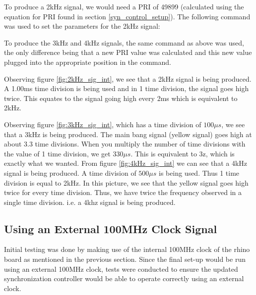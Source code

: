 \documentclass[12pt, a4paper]{article}
\begin{document}
To produce a 2kHz signal, we would need a PRI of 49899 (calculated using the equation for PRI found in section \ref{syn_control_setup}). The following command was used to set the parameters for the 2kHz signal:
	
		
To produce the 3kHz and 4kHz signals, the same command as above was used, the only difference being that a new PRI value was calculated and this new value plugged into the appropriate position in the command.

Observing figure \ref{fig:2kHz_sig_int}, we see that a 2kHz signal is being produced. A 1.00ms time division is being used and in 1 time division, the signal goes high twice. This equates to the signal going high every 2ms which is equivalent to 2kHz. 


Observing figure \ref{fig:3kHz_sig_int}, which has a time division of \( 100\mu s\), we see that a 3kHz is being produced. The main bang signal (yellow signal) goes high at about 3.3 time divisions. When you multiply the number of time divisions with the value of 1 time division, we get \(330\mu s\). This is equivalent to 3z, which is exactly what we wanted. From figure \ref{fig:4kHz_sig_int} we can see that a 4kHz signal is being produced. A time division of \(500\mu s\) is being used. Thus 1 time division is equal to 2kHz. In this picture, we see that the yellow signal goes high twice for every time division. Thus, we have twice the frequency observed in a single time division. i.e. a 4khz signal is being produced.


\subsection{Using an External 100MHz Clock Signal}

Initial testing was done by making use of the internal 100MHz clock of the rhino board as mentioned in the previous section. Since the final set-up would be run using an external 100MHz clock, tests were conducted to ensure the updated synchronization controller would be able to operate correctly using an external clock.
\end{document}
